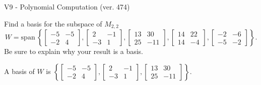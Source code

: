 \begin{exercise}
  \begin{exerciseTitle}V9 - Polynomial Computation (ver. 474)\end{exerciseTitle}
  \begin{exerciseStatement}
    Find a basis for the subspace of \(M_{2,2}\) 
\[W=\mathrm{span}\ \left\{\left[\begin{array}{cc}
-5 & -5 \\
-2 & 4
\end{array}\right] , \left[\begin{array}{cc}
2 & -1 \\
-3 & 1
\end{array}\right] , \left[\begin{array}{cc}
13 & 30 \\
25 & -11
\end{array}\right] , \left[\begin{array}{cc}
14 & 22 \\
14 & -4
\end{array}\right] , \left[\begin{array}{cc}
-2 & -6 \\
-5 & -2
\end{array}\right]\right\}.\]
 Be sure to explain why your result is a basis.


  \end{exerciseStatement}
  \begin{exerciseAnswer}
   A basis of \(W\) is  \(\left\{\left[\begin{array}{cc}
-5 & -5 \\
-2 & 4
\end{array}\right] , \left[\begin{array}{cc}
2 & -1 \\
-3 & 1
\end{array}\right] , \left[\begin{array}{cc}
13 & 30 \\
25 & -11
\end{array}\right]\right\}\).
  


  \end{exerciseAnswer}
\end{exercise}